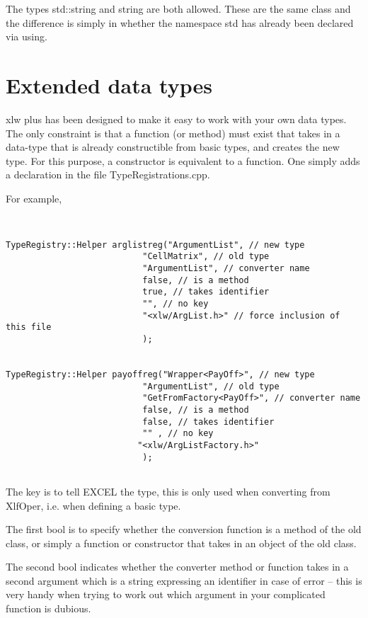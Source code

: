 \documentclass[12pt,reqno]{amsart}
\numberwithin{equation}{section}
\numberwithin{figure}{section}
\begin{document}
The types std::string and string are both allowed. These are the same
class and the difference is simply in whether the namespace std has
already been declared via using. 

\section{Extended data types}

xlw plus has been designed to make it easy to work with your own data
types. The only constraint is that a function (or method) must exist
that takes in a data-type that is already constructible from basic
types, and creates the new type. For this purpose, a constructor is
equivalent to a function. One simply adds a declaration in the file
TypeRegistrations.cpp. 

For example,
\begin{verbatim}


TypeRegistry::Helper arglistreg("ArgumentList", // new type
                           "CellMatrix", // old type
                           "ArgumentList", // converter name
                           false, // is a method
                           true, // takes identifier 
                           "", // no key
                           "<xlw/ArgList.h>" // force inclusion of this file
                           );


TypeRegistry::Helper payoffreg("Wrapper<PayOff>", // new type
                           "ArgumentList", // old type
                           "GetFromFactory<PayOff>", // converter name
                           false, // is a method
                           false, // takes identifier 
                           "" , // no key
                          "<xlw/ArgListFactory.h>"
                           );


\end{verbatim}

The key is to tell EXCEL the type, this is only used when converting
from XlfOper, i.e. when defining a basic type. 

The first bool is to specify whether the conversion function is a
method of the old class, or simply a function or constructor that
takes in an object of the old class. 

The second bool indicates whether the converter method or function
takes in a second argument which is a string expressing an identifier
in case of error -- this is very handy when trying to work out which
argument in your complicated function is dubious. 
\end{document}
